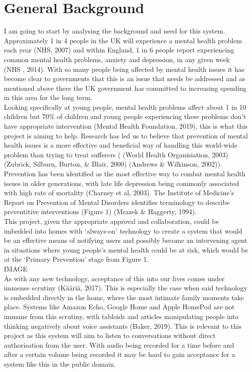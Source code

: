 \documentclass[a4paper,11pt]{report}
\begin{document}
\section{General Background}
I am going to start by analysing the background and need for this system. Approximately 1 in 4 people in the UK will experience a mental health problem each year (NHS, 2007) and within England, 1 in 6 people report experiencing common mental health problems, anxiety and depression, in any given week (NHS , 2014). With so many people being affected by mental health issues it has become clear to governments that this is an issue that needs be addressed and as mentioned above there the UK government has committed to increasing spending in this area for the long term. \\

Looking specifically at young people, mental health problems affect about 1 in 10 children but 70\% of children and young people experiencing these problems don’t have appropriate intervention (Mental Health Foundation, 2019), this is what this project is aiming to help. Research has led us to believe that prevention of mental health issues is a more effective and beneficial way of handling this world-wide problem than trying to treat sufferers ( (World Health Organisiation, 2003) (Zubrick, Silburn, Burton, \& Blair, 2000) (Andrews \& Wilkinson, 2002)). Prevention has been identified as the most effective way to combat mental health issues in older generations, with late life depression being commonly associated with high rate of mortality (Charney et al, 2003). The Institute of Medicine’s Report on Prevention of Mental Disorders identifies terminology to describe preventitive interventions (Figure 1) (Mrazek \& Haggerty, 1994).\\

This project, given the appropriate approval and collaboration, could be imbedded into homes with ‘always-on’ technology to create a system that would be an effective means of notifying users and possibly become an intervening agent in situations where young people’s mental health could be at risk, which would be at the ‘Primary Prevention’ stage from Figure 1. \\

	IMAGE\\

As with any new technology, acceptance of this into our lives comes under immense scrutiny (Kääriä, 2017). This is especially the case when said technology is embedded directly in the home, where the most intimate family moments take place. Systems like Amazon Echo, Google Home and Apple HomePod are not immune from this scrutiny, with tabloids and articles manipulating people into thinking negatively about voice assistants (Baker, 2019). This is relevant to this project as this system will aim to listen to conversations without direct authorisation from the user. With audio being recorded for a time before and after a certain volume being recorded it may be hard to gain acceptance for a system like this in the public domain.\\
\end{document}
